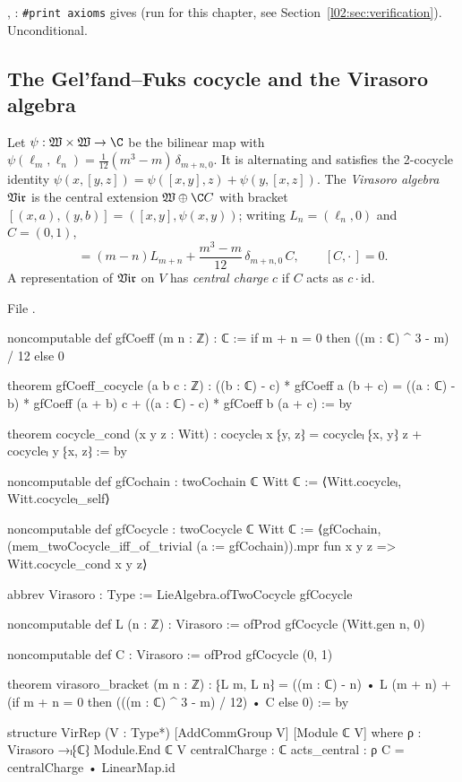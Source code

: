 \begin{status}
\allowbreak{}, \allowbreak{}: \texttt{\#print axioms} gives
 (run for this chapter, see
Section~\ref{l02:sec:verification}). Unconditional.
\end{status}

\subsection{The Gel'fand--Fuks cocycle and the Virasoro algebra}

\begin{definition}\label{l02:def:vir}
Let $\psi : \ltwoW\times\ltwoW\to\C$ be the bilinear map with
$\psi(\ell_m,\ell_n) = \frac{1}{12}(m^3-m)\,\delta_{m+n,0}$. It is alternating and satisfies the
2-cocycle identity $\psi(x,[y,z]) = \psi([x,y],z) + \psi(y,[x,z])$. The \emph{Virasoro algebra}
$\mathfrak{Vir}$ is the central extension $\ltwoW\oplus\C C$ with bracket
$[(x,a),(y,b)] = ([x,y],\psi(x,y))$; writing $L_n = (\ell_n,0)$ and $C = (0,1)$,
\begin{equation*}
 [L_m,L_n] = (m-n)L_{m+n} + \frac{m^3-m}{12}\,\delta_{m+n,0}\,C,\qquad [C,\cdot\,] = 0.
\end{equation*}
A representation of $\mathfrak{Vir}$ on $V$ has \emph{central charge} $c$ if $C$ acts as $c\cdot\mathrm{id}$.
\end{definition}

File .
\begin{leancode}
noncomputable def gfCoeff (m n : ℤ) : ℂ := if m + n = 0 then ((m : ℂ) ^ 3 - m) / 12 else 0

theorem gfCoeff_cocycle (a b c : ℤ) :
    ((b : ℂ) - c) * gfCoeff a (b + c)
      = ((a : ℂ) - b) * gfCoeff (a + b) c + ((a : ℂ) - c) * gfCoeff b (a + c) := by

theorem cocycle_cond (x y z : Witt) :
    cocycleₗ x ⁅y, z⁆ = cocycleₗ ⁅x, y⁆ z + cocycleₗ y ⁅x, z⁆ := by

noncomputable def gfCochain : twoCochain ℂ Witt ℂ := ⟨Witt.cocycleₗ, Witt.cocycleₗ_self⟩

noncomputable def gfCocycle : twoCocycle ℂ Witt ℂ :=
  ⟨gfCochain, (mem_twoCocycle_iff_of_trivial (a := gfCochain)).mpr
    fun x y z => Witt.cocycle_cond x y z⟩

abbrev Virasoro : Type := LieAlgebra.ofTwoCocycle gfCocycle

noncomputable def L (n : ℤ) : Virasoro := ofProd gfCocycle (Witt.gen n, 0)

noncomputable def C : Virasoro := ofProd gfCocycle (0, 1)

theorem virasoro_bracket (m n : ℤ) :
    ⁅L m, L n⁆ = ((m : ℂ) - n) • L (m + n)
      + (if m + n = 0 then (((m : ℂ) ^ 3 - m) / 12) • C else 0) := by

structure VirRep (V : Type*) [AddCommGroup V] [Module ℂ V] where
  ρ : Virasoro →ₗ⁅ℂ⁆ Module.End ℂ V
  centralCharge : ℂ
  acts_central : ρ C = centralCharge • LinearMap.id
\end{leancode}

